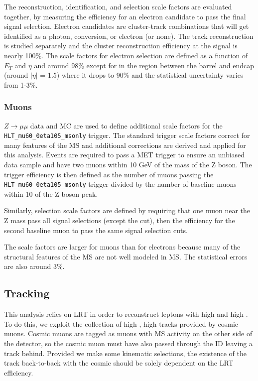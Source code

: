 The reconstruction, identification, and selection scale factors are evaluated together, by measuring the efficiency for an electron candidate to pass the final signal selection. Electron candidates are cluster-track combinations that will get identified as a photon, conversion, or electron (or none). The track reconstruction is studied separately and the cluster reconstruction efficiency at the signal \pt is nearly 100\%. The scale factors for electron selection are defined as a function of $E_{T}$ and $\eta$ and around 98\% except for in the region between the barrel and endcap (around $|\eta|$ = 1.5) where it drops to 90\% and the statistical uncertainty varies from 1-3\%. 


\subsubsection{Muons}
$Z\rightarrow \mu\mu$ data and \ac{MC} are used to define additional scale factors for the \texttt{HLT\_mu60\_0eta105\_msonly} trigger. The standard trigger scale factors correct for many features of the \ac{MS} and additional corrections are derived and applied for this analysis. Events are required to pass a \ac{MET} trigger to ensure an unbiased data sample and have two muons within 10 GeV of the mass of the Z boson. The trigger efficiency is then defined as the number of muons passing the \texttt{HLT\_mu60\_0eta105\_msonly} trigger divided by the number of baseline muons within 10 \GeV of the Z boson peak.

Similarly, selection scale factors are defined by requiring that one muon near the Z mass pass all signal selections (except the \absdz cut), then the efficiency for the second baseline muon to pass the same signal selection cuts.

The scale factors are larger for muons than for electrons because many of the structural features of the \ac{MS} are not well modeled in \ac{MS}. The statistical errors are also around 3\%.


\subsection{Tracking}
This analysis relies on \ac{LRT} in order to reconstruct leptons with high \pt and high \absdz. To do this, we exploit the collection of high \pt, high \absdz tracks provided by cosmic muons. Cosmic muons are tagged as muons with \ac{MS} activity on the other side of the detector, so the cosmic muon must have also passed through the \ac{ID} leaving a track behind. Provided we make some kinematic selections, the existence of the track back-to-back with the cosmic should be solely dependent on the \ac{LRT} efficiency.


